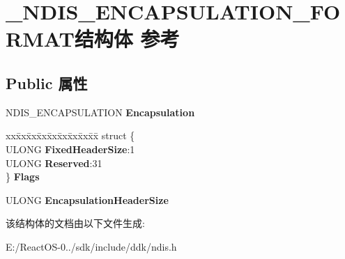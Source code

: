 \hypertarget{struct___n_d_i_s___e_n_c_a_p_s_u_l_a_t_i_o_n___f_o_r_m_a_t}{}\section{\+\_\+\+N\+D\+I\+S\+\_\+\+E\+N\+C\+A\+P\+S\+U\+L\+A\+T\+I\+O\+N\+\_\+\+F\+O\+R\+M\+A\+T结构体 参考}
\label{struct___n_d_i_s___e_n_c_a_p_s_u_l_a_t_i_o_n___f_o_r_m_a_t}
\subsection*{Public 属性}
\begin{DoxyCompactItemize}
\item 
\mbox{\label{struct___n_d_i_s___e_n_c_a_p_s_u_l_a_t_i_o_n___f_o_r_m_a_t_af818845a42e79744fceb2d1b201fa447}} 
N\+D\+I\+S\+\_\+\+E\+N\+C\+A\+P\+S\+U\+L\+A\+T\+I\+ON {\bfseries Encapsulation}
\item 
\mbox{\label{struct___n_d_i_s___e_n_c_a_p_s_u_l_a_t_i_o_n___f_o_r_m_a_t_aa34bd75e60a28441b381b14ac30b2401}} 
\begin{tabbing}
xx\=xx\=xx\=xx\=xx\=xx\=xx\=xx\=xx\=\kill
struct \{\\
\>ULONG {\bfseries FixedHeaderSize}:1\\
\>ULONG {\bfseries Reserved}:31\\
\} {\bfseries Flags}\\

\end{tabbing}\item 
\mbox{\label{struct___n_d_i_s___e_n_c_a_p_s_u_l_a_t_i_o_n___f_o_r_m_a_t_ae8cfbcde2632818ce79c5d2decd6c332}} 
U\+L\+O\+NG {\bfseries Encapsulation\+Header\+Size}
\end{DoxyCompactItemize}


该结构体的文档由以下文件生成\+:\begin{DoxyCompactItemize}
\item 
E\+:/\+React\+O\+S-\/0../sdk/include/ddk/ndis.\+h\end{DoxyCompactItemize}
